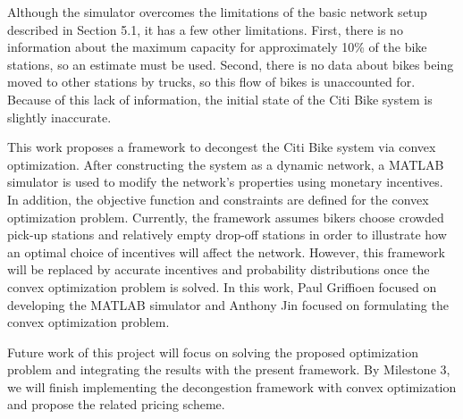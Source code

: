\documentclass[times, 10pt,twocolumn]{article}
\begin{document}
Although the simulator overcomes the limitations of the basic network setup described in Section 5.1, it has a few other limitations. First, there is no information about the maximum capacity for approximately 10\% of the bike stations, so an estimate must be used. Second, there is no data about bikes being moved to other stations by trucks, so this flow of bikes is unaccounted for. Because of this lack of information, the initial state of the Citi Bike system is slightly inaccurate.




This work proposes a framework to decongest the Citi Bike system via convex optimization. After constructing the system as a dynamic network, a MATLAB simulator is used to modify the network's properties using monetary incentives. In addition, the objective function and constraints are defined for the convex optimization problem. Currently, the framework assumes bikers choose crowded pick-up stations and relatively empty drop-off stations in order to illustrate how an optimal choice of incentives will affect the network. However, this framework will be replaced by accurate incentives and probability distributions once the convex optimization problem is solved. In this work, Paul Griffioen focused on developing the MATLAB simulator and Anthony Jin focused on formulating the convex optimization problem.

Future work of this project will focus on solving the proposed optimization problem and integrating the results with the present framework. By Milestone 3, we will finish implementing the decongestion framework with convex optimization and propose the related pricing scheme.
\end{document}

